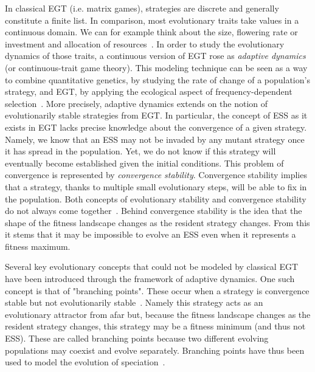             In classical EGT (i.e. matrix games), strategies are discrete and generally constitute a finite list. In comparison, most evolutionary traits take values in a continuous domain. We can for example think about the size, flowering rate or investment and allocation of resources~\parencite{McGill2007}. In order to study the evolutionary dynamics of those traits, a continuous version of EGT rose as \emph{adaptive dynamics} (or continuous-trait game theory). This modeling technique can be seen as a way to combine quantitative genetics, by studying the rate of change of a population's strategy, and EGT, by applying the ecological aspect of frequency-dependent selection~\parencite{Geritz1998, McGill2007}. More precisely, adaptive dynamics extends on the notion of evolutionarily stable strategies from EGT. In particular, the concept of ESS as it exists in EGT lacks precise knowledge about the convergence of a given strategy. Namely, we know that an ESS may not be invaded by any mutant strategy once it has spread in the population. Yet, we do not know if this strategy will eventually become established given the initial conditions. This problem of convergence is represented by \emph{convergence stability}. Convergence stability implies that a strategy, thanks to multiple small evolutionary steps, will be able to fix in the population. Both concepts of evolutionary stability and convergence stability do not always come together~\parencite{Eshel1981, Eshel1983}. Behind convergence stability is the idea that the shape of the fitness landscape changes as the resident strategy changes. From this it stems that it may be impossible to evolve an ESS even when it represents a fitness maximum.

            Several key evolutionary concepts that could not be modeled by classical EGT have been introduced through the framework of adaptive dynamics. One such concept is that of "branching points". These occur when a strategy is convergence stable but not evolutionarily stable~\parencite{Geritz1998}. Namely this strategy acts as an evolutionary attractor from afar but, because the fitness landscape changes as the resident strategy changes, this strategy may be a fitness minimum (and thus not ESS). These are called branching points because two different evolving populations may coexist and evolve separately. Branching points have thus been used to model the evolution of speciation~\parencite{Geritz2004}. 

